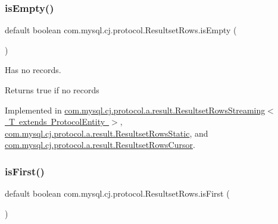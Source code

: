 \mbox{\label{interfacecom_1_1mysql_1_1cj_1_1protocol_1_1_resultset_rows_ae130183c4bba57a93d3fe890f14b6c25}} 
\subsubsection{\texorpdfstring{is\+Empty()}{isEmpty()}}
{\footnotesize\ttfamily default boolean com.\+mysql.\+cj.\+protocol.\+Resultset\+Rows.\+is\+Empty (\begin{DoxyParamCaption}{ }\end{DoxyParamCaption})}

Has no records.

\begin{DoxyReturn}{Returns}
true if no records 
\end{DoxyReturn}


Implemented in \mbox{\hyperlink{classcom_1_1mysql_1_1cj_1_1protocol_1_1a_1_1result_1_1_resultset_rows_streaming_a477080ab4c378e7bf32d5c1230ecedbe}{com.\+mysql.\+cj.\+protocol.\+a.\+result.\+Resultset\+Rows\+Streaming$<$ T extends Protocol\+Entity $>$}}, \mbox{\hyperlink{classcom_1_1mysql_1_1cj_1_1protocol_1_1a_1_1result_1_1_resultset_rows_static_a6e253f009ce83647195f60954d021cff}{com.\+mysql.\+cj.\+protocol.\+a.\+result.\+Resultset\+Rows\+Static}}, and \mbox{\hyperlink{classcom_1_1mysql_1_1cj_1_1protocol_1_1a_1_1result_1_1_resultset_rows_cursor_a3fcb0eaca47918a78033b083af35b02a}{com.\+mysql.\+cj.\+protocol.\+a.\+result.\+Resultset\+Rows\+Cursor}}.

\mbox{\label{interfacecom_1_1mysql_1_1cj_1_1protocol_1_1_resultset_rows_ae7d5b7ca8787eaca7ee5e0ca69ac2818}} 
\subsubsection{\texorpdfstring{is\+First()}{isFirst()}}
{\footnotesize\ttfamily default boolean com.\+mysql.\+cj.\+protocol.\+Resultset\+Rows.\+is\+First (\begin{DoxyParamCaption}{ }\end{DoxyParamCaption})}

